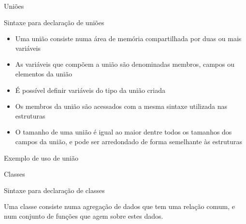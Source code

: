 \begin{frame}[fragile]{Uniões}

    \begin{block}{Sintaxe para declaração de uniões}
    \end{block}
	\begin{itemize}
		\item Uma união consiste numa área de memória compartilhada por duas ou mais variáveis

		\item As variáveis que compõem a união são denominadas membros, campos ou elementos 
        da união

		\item É possível definir variáveis do tipo da união criada

		\item Os membros da união são acessados com a mesma sintaxe utilizada nas estruturas

		\item O tamanho de uma união é igual ao maior 
		dentre todos os tamanhos dos campos da união, e pode
		ser arredondado de forma semelhante às estruturas
	\end{itemize}

\end{frame}

\begin{frame}[fragile]{Exemplo de uso de união}
\end{frame}

\begin{frame}[fragile]{Classes}

    \begin{block}{Sintaxe para declaração de classes}
    \end{block}
	
    Uma classe consiste numa agregação de dados que tem uma relação comum, e num conjunto de 
    funções que agem sobre estes dados.

\end{frame}

